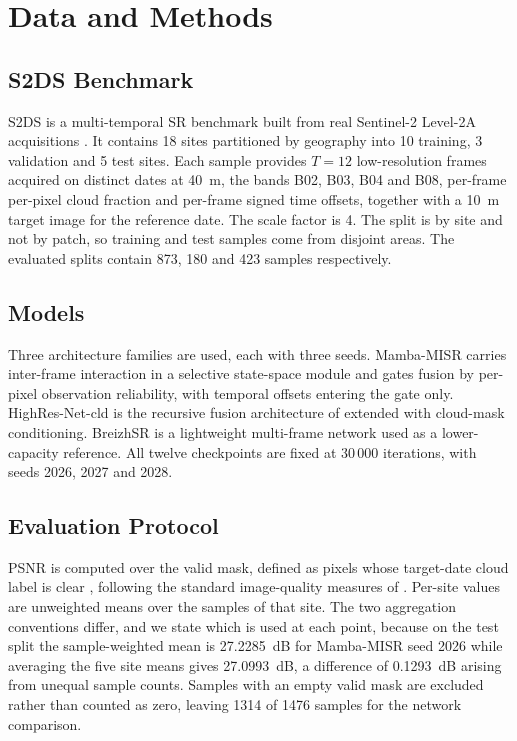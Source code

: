 \documentclass[journal]{IEEEtran}
\begin{document}
\section{Data and Methods}

\subsection{S2DS Benchmark}

S2DS is a multi-temporal SR benchmark built from real Sentinel-2 Level-2A
acquisitions \cite{drusch2012,s2psd}. It contains 18 sites partitioned by geography
into 10 training, 3 validation and 5 test sites. Each sample provides $T = 12$
low-resolution frames acquired on distinct dates at 40~m, the bands B02, B03, B04
and B08, per-frame per-pixel cloud fraction and per-frame signed time offsets,
together with a 10~m target image for the reference date. The scale factor is 4.
The split is by site and not by patch, so training and test samples come from
disjoint areas. The evaluated splits contain 873, 180 and 423 samples respectively.

\subsection{Models}

Three architecture families are used, each with three seeds. Mamba-MISR carries
inter-frame interaction in a selective state-space module \cite{mamba} and gates
fusion by per-pixel observation reliability, with temporal offsets entering the
gate only. HighRes-Net-cld is the recursive fusion architecture of
\cite{deudon2020} extended with cloud-mask conditioning. BreizhSR is a lightweight
multi-frame network \cite{okabayashi2024} used as a lower-capacity reference. All
twelve checkpoints are fixed at 30\,000 iterations, with seeds 2026, 2027 and 2028.

\subsection{Evaluation Protocol}

PSNR is computed over the valid mask, defined as pixels whose target-date cloud
label is clear \cite{cmix}, following the standard image-quality measures of
\cite{ssim2004}. Per-site values are unweighted means over the samples of that
site. The two aggregation conventions differ, and we state which is used at each
point, because on the test split the sample-weighted mean is 27.2285~dB for
Mamba-MISR seed 2026 while averaging the five site means gives 27.0993~dB, a
difference of 0.1293~dB arising from unequal sample counts. Samples with an empty
valid mask are excluded rather than counted as zero, leaving 1314 of 1476 samples
for the network comparison.
\end{document}
